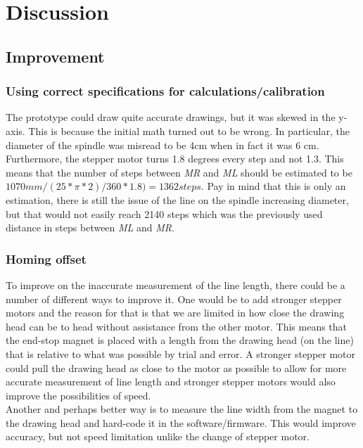 
\section{Discussion} 
\subsection{Improvement}
\subsubsection{Using correct specifications for calculations/calibration}
The prototype could draw quite accurate drawings, but it was skewed in the y-axis. This is because the initial math turned out to be wrong. In particular, the diameter of the spindle was misread to be 4cm when in fact it was 6 cm. Furthermore, the stepper motor turns 1.8 degrees every step and not 1.3. This means that the number of steps between {\it MR} and {\it ML} should be estimated to be $1070mm / (25* \pi * 2)/360*1.8) = 1362 steps $. Pay in mind that this is only an estimation, there is still the issue of the line on the spindle increasing diameter, but that would not easily reach 2140 steps which was the previously used distance in steps between {\it ML} and {\it MR}.

\subsubsection{Homing offset}
To improve on the inaccurate measurement of the line length, there could be a number of different ways to improve it. One would be to add stronger stepper motors and the reason for that is that we are limited in how close the drawing head can be to head without assistance from the other motor. This means that the end-stop magnet is placed with a length from the drawing head (on the line) that is relative to what was possible by trial and error. A stronger stepper motor could pull the drawing head as close to the motor as possible to allow for more accurate measurement of line length and stronger stepper motors would also improve the possibilities of speed. \\
Another and perhaps better way is to measure the line width from the magnet to the drawing head and hard-code it in the software/firmware. This would improve accuracy, but not speed limitation unlike the change of stepper motor.

